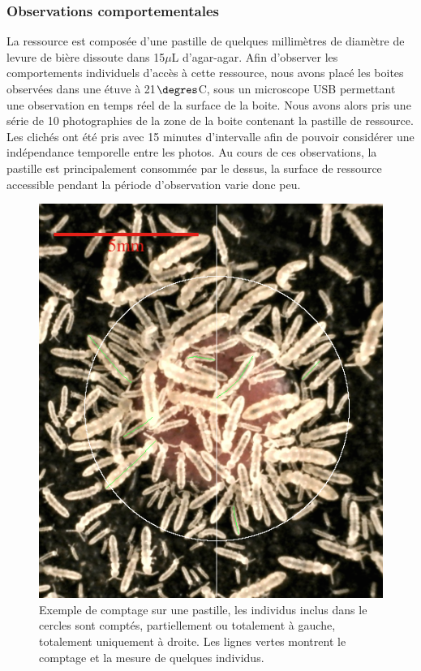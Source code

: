 \subsubsection{Observations comportementales}

La ressource est composée d'une pastille de quelques millimètres de diamètre de
levure de bière dissoute dans 15$\mu$L d'agar-agar. Afin d'observer les
comportements individuels d'accès à cette ressource, nous avons placé les boites
observées dans une étuve à 21$\degres$C, sous un microscope USB permettant une
observation en temps réel de la surface de la boite. Nous avons alors pris une
série de 10 photographies de la zone de la boite contenant la pastille de
ressource. Les clichés ont été pris avec 15 minutes d'intervalle afin de pouvoir
considérer une indépendance temporelle entre les photos. Au cours de ces
observations, la pastille est principalement consommée par le dessus, la surface
de ressource accessible pendant la période d'observation varie donc peu.

\begin{figure}[!ht]
\begin{center}
\includegraphics[height=0.25\textheight]{1_CorpsDeThese/Resumes/Fig/SM01b}
\caption[Exemple de comptage
sur une pastille]{Exemple de comptage
sur une pastille, les individus inclus dans le cercles sont comptés,
partiellement ou totalement à gauche, totalement uniquement à droite. Les
lignes vertes montrent le comptage et la mesure de quelques individus.}
\label{fig:SM1b}
\end{center}
\end{figure}


